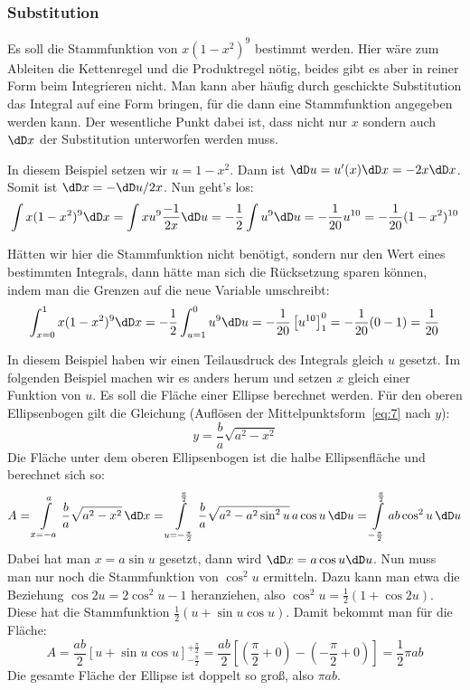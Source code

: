 \subsubsection{Substitution}
Es soll die Stammfunktion von $x(1-x^2)^9$ bestimmt werden. Hier wäre zum
Ableiten die Kettenregel und die Produktregel nötig, beides gibt es aber in
reiner Form beim Integrieren nicht. Man kann aber häufig durch geschickte
Substitution das Integral auf eine Form bringen, für die dann eine
Stammfunktion angegeben werden kann. Der wesentliche Punkt dabei ist, dass
nicht nur $x$ sondern auch $\dD x$ der Substitution unterworfen werden muss.

In diesem Beispiel setzen wir $u=1-x^2$. Dann ist $\dD u=u'(x)\dD x=-2x\dD x$.
Somit ist $\dD x=-\dD u/2x$. Nun geht's los:
\[
\int x(1-x^2)^9\dD x=\int x u^9 \frac{-1}{2x}\dD u
=-\frac{1}{2}\int u^9\dD u=-\frac{1}{20}u^{10}=-\frac{1}{20}(1-x^2)^{10}
\]

Hätten wir hier die Stammfunktion nicht benötigt, sondern nur den Wert eines
bestimmten Integrals, dann hätte man sich die Rücksetzung sparen können, indem
man die Grenzen auf die neue Variable umschreibt:
\[
\int_{x=0}^1 x(1-x^2)^9\dD x=-\frac{1}{2}\int_{u=1}^0u^9\dD u
=-\frac{1}{20}\left[u^{10}\right]_1^0=-\frac{1}{20}(0-1)=\frac{1}{20}
\]

In diesem Beispiel haben wir einen Teilausdruck des Integrals gleich $u$
gesetzt. Im folgenden Beispiel machen wir es anders herum und setzen $x$
gleich einer Funktion von $u$. Es soll die Fläche einer Ellipse berechnet
werden. Für den oberen Ellipsenbogen gilt die Gleichung (Auflösen der
Mittelpunktsform~\eqref{eq:7} nach $y$):
\[
y=\frac{b}{a}\sqrt{a^2-x^2}
\]
Die Fläche unter dem oberen Ellipsenbogen ist die halbe Ellipsenfläche und
berechnet sich so:
\[
A=\int\limits_{x=-a}^a \frac{b}{a}\sqrt{a^2-x^2}\,\dD x=
\int\limits_{u=-\frac{\pi}{2}}^{\frac{\pi}{2}}
\frac{b}{a}\sqrt{a^2-a^2\sin^2u}\,a\cos u\,\dD u=
\int\limits_{-\frac{\pi}{2}}^{\frac{\pi}{2}}ab\cos^2u\,\dD u
\]
Dabei hat man $x=a\sin u$ gesetzt, dann wird $\dD x=a\cos u \dD u$. Nun muss
man nur noch die Stammfunktion von $\cos^2u$ ermitteln. Dazu kann man etwa die
Beziehung $\cos2u=2\cos^2u-1$ heranziehen, also
$\cos^2u=\frac{1}{2}(1+\cos2u)$. Diese hat die Stammfunktion
$\frac{1}{2}(u+\sin u\cos u)$. Damit bekommt man für die Fläche:
\[
A=\frac{ab}{2}\left[u+\sin u\cos u\right]_{-\frac{\pi}{2}}^{+\frac{\pi}{2}}=
\frac{ab}{2}[(\frac{\pi}{2}+0)-(-\frac{\pi}{2}+0)]=\frac{1}{2}\pi a b
\]
Die gesamte Fläche der Ellipse ist doppelt so groß, also $\pi a b$.

